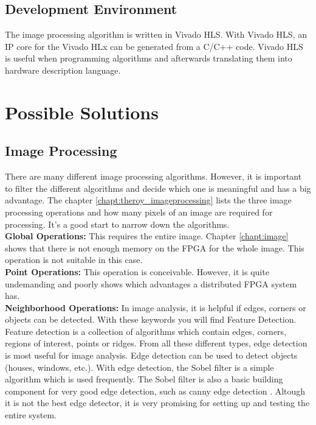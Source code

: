 \subsection{Development Environment}
The image processing algorithm is written in Vivado HLS. With Vivado HLS, an IP core for the Vivado HLx can be generated from a C/C++ code. Vivado HLS is useful when programming algorithms and afterwards translating them into hardware description language. 
\clearpage
%
%
\section{Possible Solutions} \label{chapt:solutions}
\subsection{Image Processing} \label{chapt:mission_imageprocessing}
There are many different image processing algorithms. However, it is important to filter the different algorithms and decide which one is meaningful and has a big advantage. The chapter \ref{chapt:theroy_imageprocessing} lists the three image processing operations and how many pixels of an image are required for processing. It's a good start to narrow down the algorithms.
\\

\textbf{Global Operations:} This requires the entire image. Chapter \ref{chapt:image} shows that there is not enough memory on the FPGA for the whole image. This operation is not suitable in this case.
\\

\textbf{Point Operations:} This operation is conceivable. However, it is quite undemanding and poorly shows which advantages a distributed FPGA system has. 
\\

\textbf{Neighborhood Operations:} In image analysis, it is helpful if edges, corners or objects can be detected. With these keywords you will find Feature Detection. Feature detection is a collection of algorithms which contain edges, corners, regions of interest, points or ridges. From all these different types, edge detection is most useful for image analysis. Edge detection can be used to detect objects (houses, windows, etc.).
With edge detection, the Sobel filter is a simple algorithm which is used frequently. The Sobel filter is also a basic building component for very good edge detection, such as canny edge detection \cite{canny_edge}. Altough it is not the best edge detector, it is very promising for setting up and testing the entire system.

